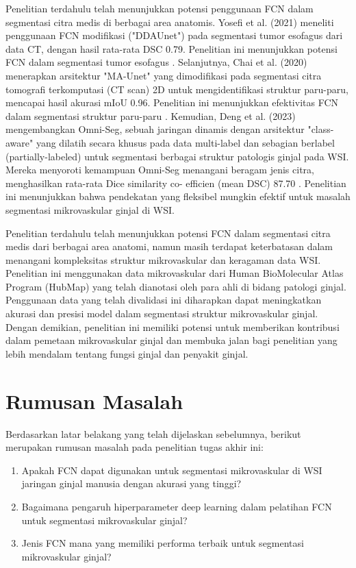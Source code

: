 \noindent Penelitian terdahulu telah menunjukkan potensi penggunaan FCN dalam segmentasi citra medis di berbagai area anatomis. Yosefi et al. (2021) meneliti penggunaan FCN modifikasi ("DDAUnet") pada segmentasi tumor esofagus dari data CT, dengan hasil rata-rata DSC 0.79. Penelitian ini menunjukkan potensi FCN dalam segmentasi tumor esofagus \cite{yousefi_esophageal_2021}. Selanjutnya, Chai et al. (2020) menerapkan arsitektur "MA-Unet" yang dimodifikasi pada segmentasi citra tomografi terkomputasi (CT scan) 2D untuk mengidentifikasi struktur paru-paru, mencapai hasil akurasi mIoU 0.96. Penelitian ini menunjukkan efektivitas FCN dalam segmentasi struktur paru-paru \cite{cai_ma-unet_2020}. Kemudian, Deng et al. (2023) mengembangkan Omni-Seg, sebuah jaringan dinamis dengan arsitektur "class-aware" yang dilatih secara khusus pada data multi-label dan sebagian berlabel (partially-labeled) untuk segmentasi berbagai struktur patologis ginjal pada WSI. Mereka menyoroti kemampuan Omni-Seg menangani beragam jenis citra, menghasilkan rata-rata Dice similarity co-
efficien (mean DSC) 87.70 \cite{deng_omni-seg_2022}. Penelitian ini menunjukkan bahwa pendekatan yang fleksibel mungkin efektif untuk masalah segmentasi mikrovaskular ginjal di WSI.

\noindent Penelitian terdahulu telah menunjukkan potensi FCN dalam segmentasi citra medis dari berbagai area anatomi, namun masih terdapat keterbatasan dalam menangani kompleksitas struktur mikrovaskular dan keragaman data WSI. Penelitian ini menggunakan data mikrovaskular dari Human BioMolecular Atlas Program (HubMap) yang telah dianotasi oleh para ahli di bidang patologi ginjal. Penggunaan data yang telah divalidasi ini diharapkan dapat meningkatkan akurasi dan presisi model dalam segmentasi struktur mikrovaskular ginjal. Dengan demikian, penelitian ini memiliki potensi untuk memberikan kontribusi dalam pemetaan mikrovaskular ginjal dan membuka jalan bagi penelitian yang lebih mendalam tentang fungsi ginjal dan penyakit ginjal. 

\section{Rumusan Masalah}
\noindent Berdasarkan latar belakang yang telah dijelaskan sebelumnya, berikut merupakan rumusan masalah pada penelitian tugas akhir ini:
\begin{enumerate}
    \item Apakah FCN dapat digunakan untuk segmentasi mikrovaskular di WSI jaringan ginjal manusia dengan akurasi yang tinggi?
    \item Bagaimana pengaruh hiperparameter deep learning dalam pelatihan FCN untuk segmentasi mikrovaskular ginjal?
    \item Jenis FCN mana yang memiliki performa terbaik untuk segmentasi mikrovaskular ginjal?
\end{enumerate}

